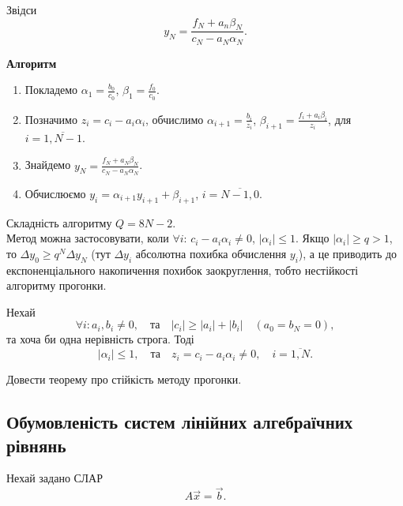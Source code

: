 Звідси
\begin{equation}
	\label{eq:3.22}
	y_N = \dfrac{f_N + a_n \beta_N}{c_N - a_N \alpha_N}.
\end{equation}

\textbf{Алгоритм}
\begin{enumerate}
	\item Покладемо $\alpha_1 = \frac{b_0}{c_0}$, $\beta_1 = \frac{f_0}{c_0}$.

	\item Позначимо $z_i = c_i - a_i \alpha_i$, обчислимо $\alpha_{i+1} = \frac{b_i}{z_i}$, $\beta_{i+1} = \frac{f_i+a_i\beta_i}{z_i}$, для $i=\overline{1,N-1}$.

	\item Знайдемо $y_N = \frac{f_N + a_N \beta_N}{c_N - a_N \alpha_N}$.

	\item Обчислюємо $y_i = \alpha_{i+1} y_{i+1} + \beta_{i+1}$, $i=\overline{N-1,0}$.
\end{enumerate}
Складність алгоритму $Q = 8N - 2$. \\

Метод можна застосовувати, коли $\forall i$: $c_i - a_i \alpha_i \ne 0$, $|\alpha_i| \le 1$. Якщо $|\alpha_i| \ge q > 1$, то $\Delta y_0 \ge q^N \Delta y_N$ (тут $\Delta y_i$ абсолютна похибка обчислення $y_i$), а це приводить до експоненціального накопичення похибок заокруглення, тобто нестійкості алгоритму прогонки.

\begin{theorem}
Нехай \[ \forall i: a_i, b_i \ne 0, \quad \text{та} \quad |c_i| \ge |a_i| + |b_i| \quad (a_0 = b_N = 0),\] та хоча би одна нерівність строга. Тоді \[ |\alpha_i| \le 1, \quad \text{та} \quad z_i = c_i - a_i \alpha_i \ne 0, \quad i = \overline{1,N}.\]
\end{theorem}

\begin{problem}
	Довести теорему про стійкість методу прогонки.
\end{problem}

\subsection{Обумовленість систем лінійних алгебраїчних рівнянь}

Нехай задано СЛАР
\begin{equation}
	\label{eq:3.23}
	A \vec x = \vec b.
\end{equation}

